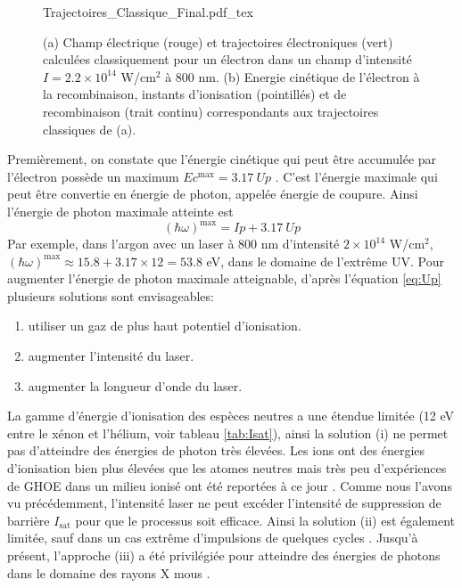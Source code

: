 \begin{figure}
\centering
\def\svgwidth{0.6\columnwidth}
{Trajectoires_Classique_Final.pdf_tex}
\caption{(a) Champ électrique (rouge) et trajectoires électroniques (vert) calculées classiquement pour un électron dans un champ d'intensité $I = 2.2 \times 10^{14}$  W/cm$^2$ à 800 nm. (b) Energie cinétique de l'électron à la recombinaison, instants d'ionisation (pointillés) et de recombinaison (trait continu) correspondants aux trajectoires classiques de (a).}
\label{fig:traj_class}
\end{figure}

Premièrement, on constate que l'énergie cinétique qui peut être accumulée par l'électron possède un maximum $Ec^{\text{max}} = 3.17 \: Up$ . C'est l'énergie maximale qui peut être convertie en énergie de photon, appelée énergie de coupure. Ainsi l'énergie de photon maximale atteinte est
\begin{equation}
(\hbar \omega)^{\text{max}} = Ip + 3.17 \: Up
\label{eq:LoiCoupure}
\end{equation}
Par exemple, dans l'argon avec un laser à 800 nm d'intensité $2 \times 10^{14}$ W/cm$^2$, $(\hbar \omega)^{\text{max}} \approx 15.8 + 3.17 \times 12 = 53.8$ eV, dans le domaine de l'extrême UV. Pour augmenter l'énergie de photon maximale atteignable, d'après l'équation \ref{eq:Up} plusieurs solutions sont envisageables:
\begin{enumerate}[label=\roman*)]
\item utiliser un gaz de plus haut potentiel d'ionisation.
\item augmenter l'intensité du laser.
\item augmenter la longueur d'onde du laser.
\end{enumerate}
La gamme d'énergie d'ionisation des espèces neutres a une étendue limitée (12 eV entre le xénon et l'hélium, voir tableau \ref{tab:Isat}), ainsi la solution (i) ne permet pas d'atteindre des énergies de photon très élevées. Les ions ont des énergies d'ionisation bien plus élevées que les atomes neutres mais très peu d'expériences de GHOE dans un milieu ionisé ont été reportées à ce jour . Comme nous l'avons vu précédemment, l'intensité laser ne peut excéder l'intensité de suppression de barrière $I_{\text{sat}}$ pour que le processus soit efficace. Ainsi la solution (ii) est également limitée, sauf dans un cas extrême d'impulsions de quelques cycles . Jusqu'à présent, l'approche (iii) a été privilégiée pour atteindre des énergies de photons dans le domaine des rayons X mous .

